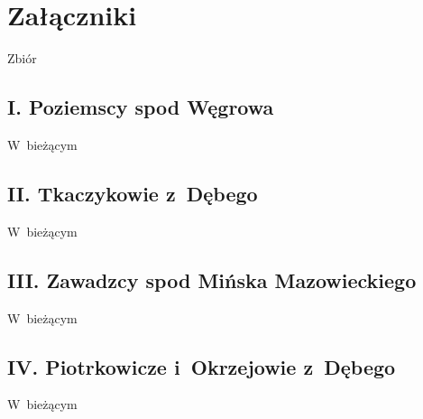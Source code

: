 \chapter*{Załączniki}

Zbiór

\section*{I. Poziemscy spod Węgrowa}

W~bieżącym

\section*{II. Tkaczykowie z~Dębego}

W~bieżącym


\section*{III. Zawadzcy spod Mińska Mazowieckiego}
\label{sec:zawadzcy}

W~bieżącym

\section*{IV. Piotrkowicze i~Okrzejowie z~Dębego}
\label{sec:piotrkowicze}

W~bieżącym